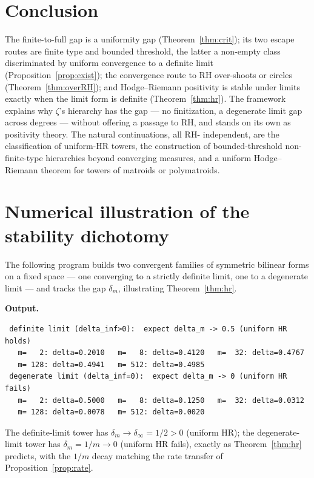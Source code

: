 \documentclass[11pt]{amsart}
\theoremstyle{definition}
\theoremstyle{remark}
\begin{document}
\section{Conclusion}
The finite-to-full gap is a uniformity gap (Theorem~\ref{thm:crit}); its two
escape routes are finite type and bounded threshold, the latter a non-empty class
discriminated by uniform convergence to a definite limit
(Proposition~\ref{prop:exist}); the convergence route to RH over-shoots or
circles (Theorem~\ref{thm:overRH}); and Hodge--Riemann positivity is stable under
limits exactly when the limit form is definite (Theorem~\ref{thm:hr}). The
framework explains why $\zeta$'s hierarchy has the gap --- no finitization, a
degenerate limit gap across degrees --- without offering a passage to RH, and
stands on its own as positivity theory. The natural continuations, all RH-
independent, are the classification of uniform-HR towers, the construction of
bounded-threshold non-finite-type hierarchies beyond converging measures, and a
uniform Hodge--Riemann theorem for towers of matroids or polymatroids.

\appendix
\section{Numerical illustration of the stability dichotomy}\label{app:code}
The following program builds two convergent families of symmetric bilinear forms
on a fixed space --- one converging to a strictly definite limit, one to a
degenerate limit --- and tracks the gap $\delta_m$, illustrating
Theorem~\ref{thm:hr}.



\medskip\noindent\textbf{Output.}
\begin{lstlisting}
 definite limit (delta_inf>0):  expect delta_m -> 0.5 (uniform HR holds)
   m=   2: delta=0.2010   m=   8: delta=0.4120   m=  32: delta=0.4767
   m= 128: delta=0.4941   m= 512: delta=0.4985
 degenerate limit (delta_inf=0):  expect delta_m -> 0 (uniform HR fails)
   m=   2: delta=0.5000   m=   8: delta=0.1250   m=  32: delta=0.0312
   m= 128: delta=0.0078   m= 512: delta=0.0020
\end{lstlisting}
The definite-limit tower has $\delta_m\to\delta_\infty=1/2>0$ (uniform HR); the
degenerate-limit tower has $\delta_m=1/m\to0$ (uniform HR fails), exactly as
Theorem~\ref{thm:hr} predicts, with the $1/m$ decay matching the rate transfer of
Proposition~\ref{prop:rate}.
\end{document}
